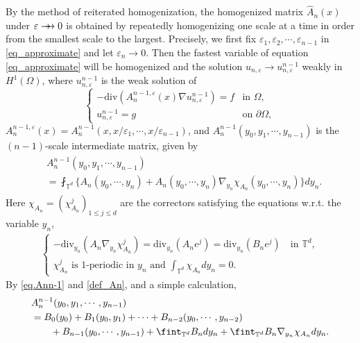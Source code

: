 \documentclass[reqno,12pt]{amsart} %
\theoremstyle{definition}
\theoremstyle{remark}
\numberwithin{equation}{section}
\newcommand{\e}{\varepsilon}
\newcommand{\doublerightarrow}{%
  \mathrel{%
    \mathchoice
      {\rightarrow\mspace{-10mu}\rightarrow} %
      {\rightarrow\mspace{-10mu}\rightarrow} %
      {\rightarrow\mspace{-10mu}\rightarrow} %
      {\rightarrow\mspace{-10mu}\rightarrow} %
  }%
}
\begin{document}

By the method of reiterated homogenization, the homogenized matrix $\widehat{A}_n(x)$ under $\e \doublerightarrow 0$ is obtained by repeatedly homogenizing one scale at a time in order from the smallest scale to the largest. 
Precisely, we first fix $\e_1,\e_2,\cdots, \e_{n-1}$ in \eqref{eq_approximate} and let $\e_n \to 0$. Then the fastest variable of equation \eqref{eq_approximate} will be homogenized and the solution $u_{n,\e} \to u^{n-1}_{n,\e}$ weakly in $H^1(\Omega)$, where $u^{n-1}_{n,\e}$ is the weak solution of
\begin{equation}\label{eq.approx.n-1}
    \begin{cases}
    -\mathrm{div}(A_n^{n-1,\varepsilon}(x)\nabla u^{n-1}_{n, \varepsilon})=f&\text{in }\Omega,\\
        u^{n-1}_{n, \varepsilon}=g& \text{on }\partial\Omega,
  \end{cases}
\end{equation}
 $A_n^{n-1,\varepsilon}(x) = A^{n-1}_n(x,x/\e_1,\cdots, x/\e_{n-1})$, and $A^{n-1}_n(y_0, y_1, \cdots, y_{n-1})$ is the $(n-1)$-scale intermediate matrix, given by
\begin{align}\label{eq.Ann-1}
\begin{aligned}
    & A_n^{n-1}(y_0, y_1, \cdots, y_{n-1}) \\
    & =\fint_{\mathbb{T}^d} \Big\{ A_n(y_0, \cdots, y_n)+A_n(y_0, \cdots, y_n)\nabla_{y_n}\chi_{A_n}(y_0, \cdots, y_n) \Big\} dy_n.
\end{aligned}
\end{align}
Here $\chi_{A_n} = (\chi_{A_n}^j)_{1\le j\le d}$ are the correctors satisfying the equations w.r.t. the variable $y_n$,
\begin{align*}
  \begin{cases}
    -\mathrm{div}_{y_n}(A_n\nabla_{y_n} \chi_{A_n}^j)=\mathrm{div}_{y_n}(A_ne^j)=\mathrm{div}_{y_n}(B_ne^j)\quad \text{in }\mathbb{T}^d,\\
  \chi_{A_n}^j \text{ is $1$-periodic in }y_n \text{ and }\int_{\mathbb{T}^d}\chi_{A_n}dy_n=0.
  \end{cases}
\end{align*}
By \eqref{eq.Ann-1} and \eqref{def_An}, and a simple calculation,
\begin{equation}\label{def_Ank}
\aligned
    & A_n^{n-1}(y_0, y_1, \cdots, y_{n-1})\\
    & = B_0(y_0)+B_1(y_0, y_1)+\cdots+B_{n-2}(y_0, \cdots, y_{n-2})\\
    & \qquad + B_{n-1}(y_0, \cdots, y_{n-1})+\fint_{\mathbb{T}^d}B_ndy_n+\fint_{\mathbb{T}^d}B_n\nabla_{y_n}\chi_{A_n} dy_n.
    \endaligned
\end{equation}
\end{document}

